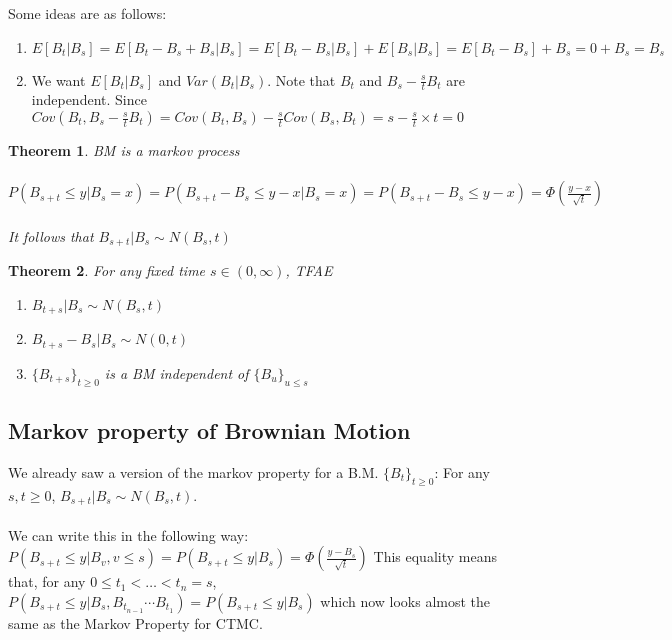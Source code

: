 \documentclass[12pt]{article}
\newtheorem{theorem}{Theorem}
\begin{document}
\noindent Some ideas are as follows:

\begin{enumerate}
    \item $E[B_t|B_s] = E[B_t-B_s+B_s|B_s] = E[B_t-B_s|B_s] + E[B_s|B_s] = E[B_t-B_s] + B_s = 0 + B_s = B_s$
    \item We want $E[B_t|B_s]$ and $Var(B_t|B_s)$. Note that $B_t$ and $B_s - \frac{s}{t}B_t$ are independent. Since $Cov(B_t, B_s - \frac{s}{t}B_t) = Cov(B_t, B_s) - \frac{s}{t}Cov(B_s,B_t) = s - \frac{s}{t}\times t = 0$
\end{enumerate}

\begin{theorem}
    BM is a markov process
    \\
    \\
    \begin{math}
    P(B_{s+t}\leq y | B_s = x) = P(B_{s+t} - B_s \leq y - x | B_s = x)
    =P(B_{s+t} - B_s \leq y - x)
    =\Phi (\frac{y-x}{\sqrt{t}})
    \end{math}
    \\
    \\It follows that $B_{s+t}|B_s \sim N(B_s,t)$
\end{theorem}

\begin{theorem}
    For any fixed time $s \in (0, \infty)$, TFAE
    \begin{enumerate}
        \item $B_{t+s} | B_s \sim N(B_s, t)$
        \item $B_{t+s} - B_s | B_s \sim N(0,t)$
        \item $\{B_{t+s}\}_{t\geq 0}$ is a BM independent of $\{B_u\}_{u \leq s}$
    \end{enumerate}
\end{theorem}

\subsection{Markov property of Brownian Motion}

We already saw a version of the markov property for a B.M. $\{B_t\}_{t\geq 0}$: For any $s, t \geq 0$, $B_{s+t}|B_s \sim N(B_s,t)$.
\\
\\
We can write this in the following way:
$P(B_{s+t}\leq y | B_v, v\leq s) = P(B_{s+t} \leq y | B_s) =\Phi (\frac{y-B_s}{\sqrt{t}})$ This equality means that, for any $0 \leq t_1 < \dots < t_n = s$, $P(B_{s+t} \leq y | B_s, B_{t_{n-1}}\cdots B_{t_1}) = P(B_{s+t} \leq y | B_s)$ which now looks almost the same as the Markov Property for CTMC.
\end{document}
